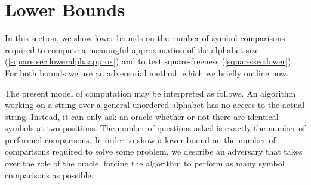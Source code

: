 \section{Lower Bounds}
\label{square:sec:lowerbounds}

In this section, we show lower bounds on the number of symbol comparisons required to compute a meaningful approximation of the alphabet size (\cref{square:sec:loweralphaapprox}) and to test square-freeness (\cref{square:sec:lower}).
For both bounds we use an adversarial method, which we briefly outline now.

The present model of computation may be interpreted as follows. 
An algorithm working on a string over a general unordered alphabet has no access to the actual string. 
Instead, it can only ask an oracle whether or not there are identical symbols at two positions. 
The number of questions asked is exactly the number of performed comparisons.
In order to show a lower bound on the number of comparisons required to solve some problem, we describe an adversary that takes over the role of the oracle, forcing the algorithm to perform as many symbol comparisons as possible.



\iffalse
Particularly, in \cref{square:sec:loweralphaapprox}, the adversary keeps the answers consistent with strings of vastly different alphabet sizes. As long as the algorithm performs fewer than $\frac{ns} 4$ comparisons, the adversary can guarantee that its answers are consistent with strings whose alphabet sizes vary by a factor of $\Omega(n)$. Thus, estimating the alphabet size up to a factor of $o(n)$ takes $\Omega(ns)$ comparisons.
In \cref{square:sec:lower}, the adversary keeps the answers consistent with at least one string that does contain a square, and at least one string that does not. It takes $\Omega(n\lg s)$ comparisons until the adversary has to definitively decide whether the string is square-free or not. Thus testing square-freeness takes $\Omega(n \lg s)$ comparisons.
\fi

\newcommand{\yesedges}{E_\textnormal{yes}}
\newcommand{\noedges}{E_\textnormal{no}}
\newcommand{\nodecol}[1]{\gamma(#1)}


